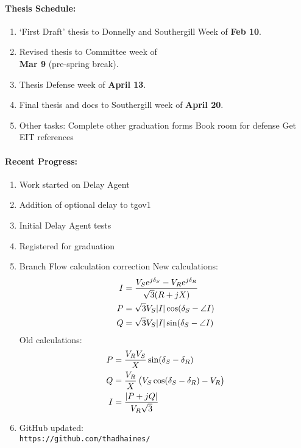 \documentclass[12pt]{article}
\begin{document}
\begin{multicols}{2}
\raggedright
	\paragraph{Thesis Schedule:}
	\begin{enumerate}
\itemsep0em 
		\item `First Draft' thesis to Donnelly and Southergill Week of\textbf{ Feb 10}.
		\item Revised thesis to Committee week of \\ \textbf{Mar 9} (pre-spring break).
		\item Thesis Defense week of \textbf{April 13}.
		\item Final thesis and docs to Southergill week of \textbf{April 20}.
\item Other tasks:
\subitem Complete other graduation forms
\subitem Book room for defense
\subitem Get EIT references
\end{enumerate}

	\paragraph{Recent Progress:}
	\begin{enumerate}
\itemsep0em 
\item Work started on Delay Agent
\item Addition of optional delay to tgov1
\item Initial Delay Agent tests
\item Registered for graduation
\item Branch Flow calculation correction
\subitem New calculations:
\begin{align}
	I &= \dfrac{ V_S e^{j\delta_S}-V_R e^{j\delta_R}}{\sqrt{3} (R+jX)}\\
	P &=  \sqrt{3} V_S  \abs{I} \cos(\delta_S -\angle{I}) \\
	Q &= \sqrt{3} V_S  \abs{I} \sin(\delta_S -\angle{I}) 
\end{align}
\subitem Old calculations: 
\begin{align}
P &= \dfrac{V_R V_S}{X} \sin(\delta_S - \delta_R)\\
Q &= \dfrac{V_R}{X} \left(V_S\cos(\delta_S - \delta_R)-V_R\right)\\
I &= \dfrac{\abs{P + jQ}}{V_R\sqrt{3}}
\end{align}

		\item GitHub updated:\\
		\verb|https://github.com/thadhaines/ |


\end{enumerate}
\end{multicols}
\end{document}
